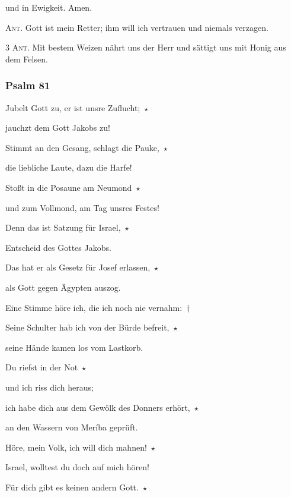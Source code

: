 und in Ewigkeit. Amen.

\vspace{10pt}

\noindent \textsc{Ant.} Gott ist mein Retter; ihm will ich vertrauen und niemals verzagen. 

\vspace{10pt}

\noindent \textsc{3 Ant.} Mit bestem Weizen nährt uns der Herr und sättigt uns mit Honig aus dem Felsen.

\subsubsection{Psalm 81}

\noindent Jubelt Gott zu, er ist unsre Zuflucht;~$\star$~\nopagebreak

jauchzt dem Gott Jakobs zu!

\noindent Stimmt an den Gesang, schlagt die Pauke,~$\star$~\nopagebreak

die liebliche Laute, dazu die Harfe! 

\noindent Stoßt in die Posaune am Neumond~$\star$~\nopagebreak

und zum Vollmond, am Tag unsres Festes!

\noindent Denn das ist Satzung für Israel,~$\star$~\nopagebreak

Entscheid des Gottes Jakobs.

\noindent Das hat er als Gesetz für Josef erlassen,~$\star$~\nopagebreak

als Gott gegen Ägypten auszog.

\noindent Eine Stimme höre ich, die ich noch nie vernahm:~†~\nopagebreak

Seine Schulter hab ich von der Bürde befreit,~$\star$~\nopagebreak

seine Hände kamen los vom Lastkorb.

\noindent Du riefst in der Not~$\star$~\nopagebreak

und ich riss dich heraus;

\noindent ich habe dich aus dem Gewölk des Donners erhört,~$\star$~\nopagebreak

an den Wassern von Meríba geprüft.

\noindent Höre, mein Volk, ich will dich mahnen!~$\star$~\nopagebreak

Israel, wolltest du doch auf mich hören!

\noindent Für dich gibt es keinen andern Gott.~$\star$~\nopagebreak

